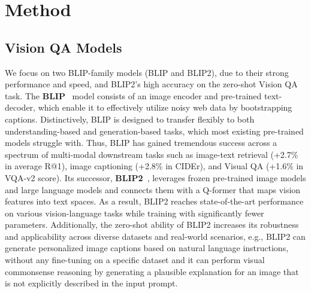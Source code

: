 \section{Method}

\subsection{Vision QA Models}


We focus on two BLIP-family models (BLIP and BLIP2), due to their strong performance and speed, and BLIP2's high accuracy on the zero-shot Vision QA task. 
The \textbf{BLIP}~\citep{blip} model consists of an image encoder and pre-trained text-decoder, which enable it to effectively utilize noisy web data by bootstrapping captions. 
Distinctively, BLIP is designed to transfer flexibly to both understanding-based and generation-based tasks, which most existing pre-trained models struggle with. Thus,
BLIP has gained tremendous success across a spectrum of multi-modal downstream tasks such as image-text retrieval (+2.7\% in average R@1), image captioning (+2.8\% in CIDEr), and Visual QA (+1.6\% in VQA-v2 score). 
Its successor, \textbf{BLIP2}~\citep{li2023blip}, 
leverages frozen pre-trained image models and large language models and connects them with a Q-former that maps vision features into text spaces. As a result, BLIP2 reaches state-of-the-art performance on various vision-language tasks while training with significantly fewer parameters. Additionally, the zero-shot ability of BLIP2 increases its robustness and applicability across diverse datasets and real-world scenarios, e.g., BLIP2 can generate personalized image captions based on natural language instructions, without any fine-tuning on a specific dataset and it can perform visual commonsense reasoning by generating a plausible explanation for an image that is not explicitly described in the input prompt. 



